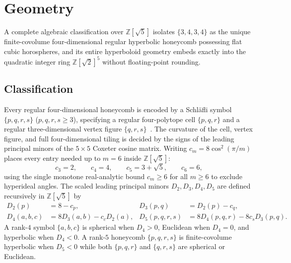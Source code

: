 \section{Geometry}
\label{sec:geometry}

A complete algebraic classification over $\mathbb{Z}[\sqrt{5}]$ isolates $\{3,4,3,4\}$ as the unique finite-covolume four-dimensional regular hyperbolic honeycomb possessing flat cubic horospheres, and its entire hyperboloid geometry embeds exactly into the quadratic integer ring $\mathbb{Z}[\sqrt{2}]^5$ without floating-point rounding.

\subsection{Classification}
\label{subsec:classification}

Every regular four-dimensional honeycomb is encoded by a Schl\"afli symbol $\{p,q,r,s\}$ ($p,q,r,s \ge 3$), specifying a regular four-polytope cell $\{p,q,r\}$ and a regular three-dimensional vertex figure $\{q,r,s\}$~\cite{coxeter1956,coxeter1973}. The curvature of the cell, vertex figure, and full four-dimensional tiling is decided by the signs of the leading principal minors of the $5 \times 5$ Coxeter cosine matrix. Writing $c_m = 8\cos^2(\pi/m)$ places every entry needed up to $m=6$ inside $\mathbb{Z}[\sqrt{5}]$:
\begin{equation}
\label{eq:cos-sq-z5}
c_3 = 2, \qquad c_4 = 4, \qquad c_5 = 3 + \sqrt{5}, \qquad c_6 = 6,
\end{equation}
using the single monotone real-analytic bound $c_m \ge 6$ for all $m \ge 6$ to exclude hyperideal angles. The scaled leading principal minors $D_2, D_3, D_4, D_5$ are defined recursively in $\mathbb{Z}[\sqrt{5}]$ by
\begin{align}
D_2(p) &= 8 - c_p, & D_3(p,q) &= D_2(p) - c_q, \label{eq:schlafli-minor23}\\
D_4(a,b,c) &= 8 D_3(a,b) - c_c D_2(a), & D_5(p,q,r,s) &= 8 D_4(p,q,r) - 8 c_s D_3(p,q). \label{eq:schlafli-minor45}
\end{align}
A rank-$4$ symbol $\{a,b,c\}$ is spherical when $D_4 > 0$, Euclidean when $D_4 = 0$, and hyperbolic when $D_4 < 0$. A rank-$5$ honeycomb $\{p,q,r,s\}$ is finite-covolume hyperbolic when $D_5 < 0$ while both $\{p,q,r\}$ and $\{q,r,s\}$ are spherical or Euclidean.


